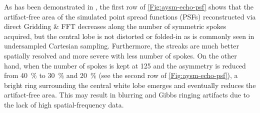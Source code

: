 As has been demonstrated in \cite{2004_MRI_Bernstein}, the first row of \cref{Fig:aysm-echo-psf} shows that the artifact-free area of the simulated point spread functions (\acsp{PSF}) reconstructed via direct Gridding \& FFT decreases along the number of symmetric spokes acquired, but the central lobe is not distorted or folded-in as is commonly seen in undersampled Cartesian sampling. Furthermore, the streaks are much better spatially resolved and more severe with less number of spokes. On the other hand, when the number of spokes is kept at \num{125} and the asymmetry is reduced from \SI{40}{\percent} to \SI{30}{\percent} and \SI{20}{\percent} (see the second row of \cref{Fig:aysm-echo-psf}), a bright ring surrounding the central white lobe emerges and eventually reduces the artifact-free area. This may result in blurring and Gibbs ringing artifacts due to the lack of high spatial-frequency data. 
